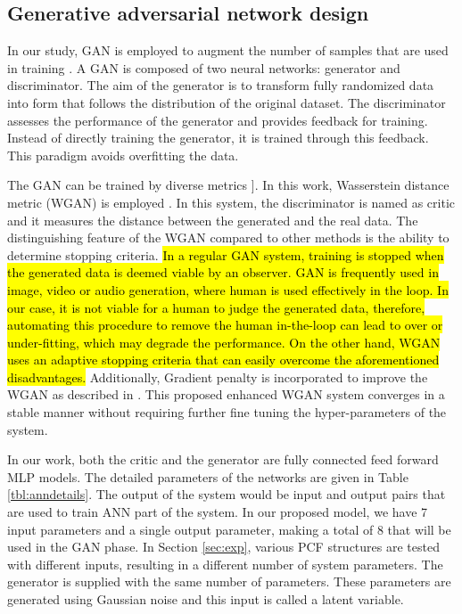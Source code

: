 \documentclass[journal]{IEEEtran}
\begin{document}
\subsection{Generative adversarial network design}
\label{ssec:gan}
In our study, GAN is employed to augment the number of samples that are used in training  \cite{goodfellow2014generative}. A GAN is composed of two neural networks: generator and discriminator. The aim of the generator is to transform fully randomized data into form that follows the distribution of the original dataset. The discriminator assesses the performance of the generator and provides feedback for training. Instead of directly training the generator, it is trained through this feedback. This paradigm avoids overfitting the data.

The GAN can be trained by diverse metrics \cite{goodfellow2014generative, lucic2018gans}]. In this work, Wasserstein distance metric (WGAN) is employed \cite{arjovsky2017wasserstein}. In this system, the discriminator is named as critic and it measures the distance between the generated and the real data. The distinguishing feature of the WGAN compared to other methods is the ability to determine stopping criteria. \hl{In a regular GAN system, training is stopped when the generated data is deemed viable by an observer. GAN is frequently used in image, video or audio generation, where human is used effectively in the loop. In our case, it is not viable for a human to judge the generated data, therefore, automating this procedure to remove the human in-the-loop can lead to over or under-fitting, which may degrade the performance. On the other hand, WGAN uses an adaptive stopping criteria that can easily overcome the aforementioned disadvantages.} Additionally, Gradient penalty is incorporated to improve the WGAN as described in \cite{gulrajani2017improved}. This proposed enhanced WGAN system converges in a stable manner without requiring further fine tuning the hyper-parameters of the system. %

In our work, both the critic and the generator are fully connected feed forward MLP models. The detailed parameters of the networks are given in Table \ref{tbl:anndetails}. The output of the system would be input and output pairs that are used to train ANN part of the system. In our proposed model, we have 7 input parameters and a single output parameter, making a total of 8 that will be used in the GAN phase. In Section  \ref{sec:exp}, various PCF structures are tested with different inputs, resulting in a different number of system parameters. The generator is supplied with the same number of parameters. These parameters are generated using Gaussian noise and this input is called a latent variable.
\end{document}
